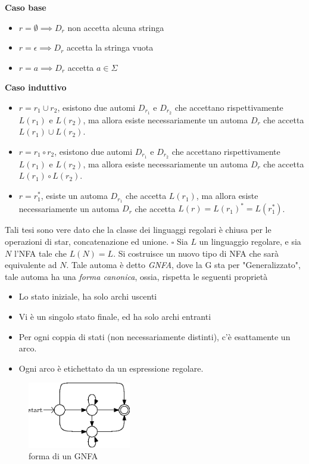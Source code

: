 \documentclass[10pt, letterpaper]{report}
\begin{document}
\textbf{Caso base }\begin{itemize}
    \item $r=\emptyset\implies D_r$ non accetta alcuna stringa 
    \item $r=\epsilon\implies D_r$  accetta la stringa vuota
    \item $r=a\implies D_r$  accetta  $a\in\Sigma$
\end{itemize}
\textbf{Caso induttivo}\begin{itemize}
    \item $r=r_1\cup r_2$, esistono due automi $D_{r_1}$ e  $D_{r_2}$ che accettano rispettivamente $L(r_1)$ 
    e $L(r_2)$, ma allora esiste necessariamente un automa $D_r$ che accetta $L(r_1)\cup L(r_2)$.
    \item $r=r_1\circ r_2$,  esistono due automi $D_{r_1}$ e  $D_{r_2}$ che accettano rispettivamente $L(r_1)$ 
    e $L(r_2)$, ma allora esiste necessariamente un automa $D_r$ che accetta $L(r_1)\circ L(r_2)$.
    \item $r=r_1^*$, esiste un automa $D_{r_1}$  che accetta
     $L(r_1)$, ma allora esiste necessariamente un automa $D_r$ che accetta $L(r)=L(r_1)^*=L(r_1^*)$.
\end{itemize}
Tali tesi sono vere dato che la classe dei linguaggi regolari è chiusa per le operazioni di star, concatenazione 
ed unione. $\square $\acc 
{} Sia $L$ un linguaggio regolare, e sia $N$ l'NFA tale che 
$L(N)=L$. Si costruisce un nuovo tipo di NFA che sarà equivalente ad $N$. Tale automa è detto \textit{GNFA}, 
dove la G sta per "Generalizzato", tale automa ha una \textit{forma canonica}, ossia, rispetta le seguenti 
proprietà \begin{itemize}
    \item Lo stato iniziale, ha solo archi uscenti 
    \item Vi è un singolo stato finale, ed ha solo archi entranti
    \item Per ogni coppia di stati (non necessariamente distinti), c'è esattamente un arco.
    \item Ogni arco è etichettato da un espressione regolare.
\end{itemize}
\begin{center}
    \begin{figure}[h!]
        \centering 
        \includegraphics[width=0.4\textwidth ]{images/GNFA.eps}
        \caption{forma di un GNFA}
        \label{fig:GNFA}
    \end{figure}
\end{center}
\end{document}
